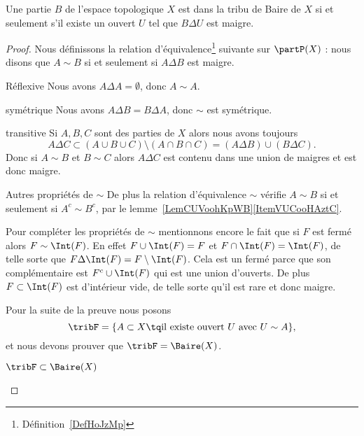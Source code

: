 \begin{proposition}  \label{PropGRHootvAWq}
    Une partie \( B\) de l'espace topologique \( X\) est dans la tribu de Baire de \( X\) si et seulement s'il existe un ouvert \( U\) tel que \( B\Delta U\) est maigre.
\end{proposition}

\begin{proof}
    Nous définissons la relation d'équivalence\footnote{Définition~\ref{DefHoJzMp}} suivante sur \( \partP(X)\) : nous disons que \( A\sim B\) si et seulement si \( A\Delta B\) est maigre.
    \begin{subproof}
    \item[Réflexive]
        Nous avons \( A\Delta A=\emptyset\), donc \( A\sim A\).
    \item[symétrique] Nous avons \( A\Delta B=B\Delta A\), donc \( \sim\) est symétrique.
    \item[transitive] Si \( A,B,C\) sont des parties de \( X\) alors nous avons toujours
        \begin{equation}
            A\Delta C\subset (A\cup B\cup C)\setminus(A\cap B\cap C)=(A\Delta B)\cup (B\Delta C).
        \end{equation}
        Donc si \( A\sim B\) et \( B\sim C\) alors \( A\Delta C\) est contenu dans une union de maigres et est donc maigre.
    \item[Autres propriétés de \( \sim\)]
        De plus la relation d'équivalence \( \sim\) vérifie \( A\sim B\) si et seulement si \( A^c\sim B^c\), par le lemme~\ref{LemCUVoohKpWB}\ref{ItemVUCooHAztC}.

        Pour compléter les propriétés de \( \sim\) mentionnons encore le fait que si \( F\) est fermé alors \( F\sim\Int(F)\). En effet \( F\cup\Int(F)=F\) et \( F\cap\Int(F)=\Int(F)\), de telle sorte que \( F\Delta\Int(F)=F\setminus\Int(F)\). Cela est un fermé parce que son complémentaire est \( F^c\cup\Int(F)\) qui est une union d'ouverts. De plus \( F\subset\Int(F)\) est d'intérieur vide, de telle sorte qu'il est rare et donc maigre.
    \end{subproof}

    Pour la suite de la preuve nous posons
    \begin{equation}
        \tribF=\{ A\subset X\tq\text{il existe ouvert } U\text{ avec } U\sim A \},
    \end{equation}
    et nous devons prouver que \( \tribF=\Baire(X)\).

    \begin{subproof}
        \item[\( \tribF\subset\Baire(X)\)]


\end{subproof}
\end{proof}
